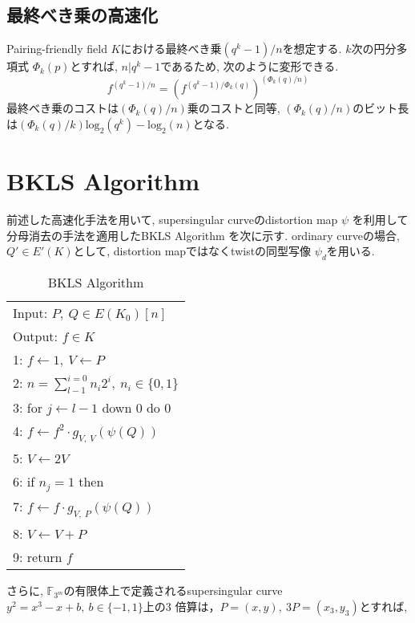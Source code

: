 \subsection{最終べき乗の高速化}
Pairing-friendly field $K$における最終べき乗$(q^k - 1) / n$を想定する. $k$次の円分多項式 $\Phi _k(p)$とすれば, $n|q^k - 1$であるため, 次のように変形できる.
\[
f^{(q^k - 1) / n} = (f^{(q^k - 1) / \Phi _k(q)})^{(\Phi _k(q) / n)}
\]
最終べき乗のコストは$(\Phi _k(q) / n)$乗のコストと同等, $(\Phi _k(q) / n)$のビット長は$(\Phi _k(q) / k)\mbox{log} _2 (q^k) - \mbox{log} _2 (n)$となる.
\clearpage
\section{BKLS Algorithm}
前述した高速化手法を用いて, supersingular curveのdistortion map $\psi$ を利用して分母消去の手法を適用したBKLS Algorithm \cite{BKLS02}を次に示す. ordinary curveの場合, $Q' \in E'(K)$として, distortion mapではなくtwistの同型写像 $\psi _d$を用いる.
\vspace{-0.5cm}
\par
\begin{table}[htbp]
 \begin{center}
  \begin{tabular}{|l|}
     \hline
     Input: $P,\ Q \in E(K_0)[n]$\\
     Output: $f \in K$\\
     \hline
     1: \quad $f \gets 1,\ V \gets P$\\
     2: \quad $n=\sum_{l-1}^{i=0} n_i 2^i, \ n_i \in \{0,1\}$\\
     3: \quad for $j \gets l-1$ down 0 do 0\\
     4: \quad \quad $f \gets f^2 \cdot g_{V,\ V}(\psi (Q))$\\
     5: \quad \quad $V \gets 2V$\\
     6: \quad if $n_j = 1$ then\\
     7: \quad \quad $f \gets f \cdot g_{V,\ P}(\psi (Q))$\\
     8: \quad \quad $V \gets V+P$\\
     9: \quad return $f$\\
     \hline
   \end{tabular}
 \end{center}
 \caption{BKLS Algorithm}
\end{table}
\vspace{-0.5cm}
\par
さらに, $\mathbb{F}_{3^m}$の有限体上で定義されるsupersingular curve $y^2 = x^3 - x + b,\ b \in \{-1,1\} $上の3 倍算は，$P = (x, y),\ 3P = (x_3, y_3) $とすれば,
